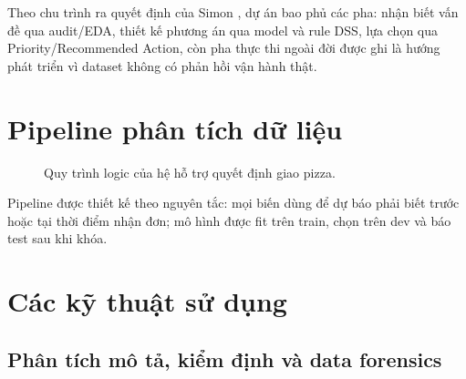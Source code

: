 \documentclass[12pt,a4paper,oneside]{report}
\begin{document}
Theo chu trình ra quyết định của Simon \cite{simon1960}, dự án bao phủ các pha:
nhận biết vấn đề qua audit/EDA, thiết kế phương án qua model và rule DSS, lựa
chọn qua Priority/Recommended Action, còn pha thực thi ngoài đời được ghi là
hướng phát triển vì dataset không có phản hồi vận hành thật.

\section{Pipeline phân tích dữ liệu}

\begin{figure}[H]
\centering
{}
\caption{Quy trình logic của hệ hỗ trợ quyết định giao pizza.}
\end{figure}

Pipeline được thiết kế theo nguyên tắc: mọi biến dùng để dự báo phải biết trước
hoặc tại thời điểm nhận đơn; mô hình được fit trên train, chọn trên dev và báo
test sau khi khóa.

\section{Các kỹ thuật sử dụng}

\subsection{Phân tích mô tả, kiểm định và data forensics}
\end{document}
